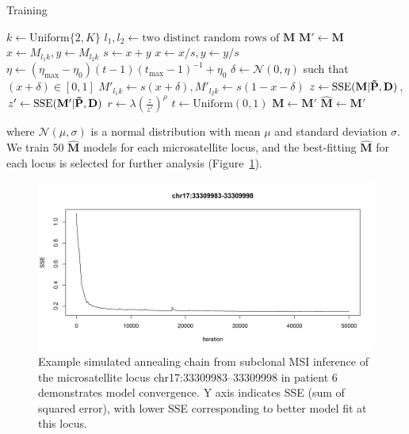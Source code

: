 \begin{algorithm}[H]
	\caption{Training}
	\label{alg:msiclones:mh-train}
	\begin{algorithmic}[1]
			\State $k \gets \text{Uniform}\{2, K\}$ 
			\State $l_1, l_2 \gets \text{two distinct random rows of } \mathbf{M}$ 
			\State $\mathbf{M}' \gets \mathbf{M}$
			\State $x \gets M_{l_1 k}, y \gets M_{l_2 k}$
			\State $s \gets {x + y}$
			\State $x \gets x/s, y \gets y/s$
			\State $\eta \gets (\eta_\text{max} - \eta_0)(t-1)(t_\text{max}-1)^{-1} + \eta_0$ 
			\State $\delta \gets \mathcal{N}(0, \eta)$ such that $(x + \delta) \in [0, 1]$
			\State $M'_{l_1 k} \gets s(x + \delta), M'_{l_2 k} \gets s(1 - x - \delta)$ 
			\State $z \gets \operatorname{SSE}(\mathbf{M} | \mathbf{\tilde{P}}, \mathbf{D})$, $z' \gets \operatorname{SSE}(\mathbf{M}' | \mathbf{\tilde{P}}, \mathbf{D})$
			\State $r \gets \lambda (\!\frac{z}{z'}\!)^\rho$
			\State $t \gets \text{Uniform}(0, 1)$
				{$\mathbf{M} \gets \mathbf{M}'$} 
				{$\hat{\mathbf{M}} \gets \mathbf{M}'$} 
		\EndFor
	\end{algorithmic}
\end{algorithm}%
\noindent where $\mathcal{N}(\mu, \sigma)$ is a normal distribution with mean $\mu$ and standard deviation $\sigma$. We train 50 $\hat{\mathbf{M}}$ models for each microsatellite locus, and the best-fitting $\hat{\mathbf{M}}$ for each locus is selected for further analysis (Figure~\ref{fig:msiclones:mcmc_path}).

\begin{figure}[ht]
    \begin{center}
        \includegraphics[width=0.95\linewidth]{images/msiclones/mcmc_path}
    \end{center}
	\vspace{-0.3cm}
    \caption[Example simulated annealing chain.]{Example simulated annealing chain from subclonal MSI inference of the microsatellite locus chr17:33309983--33309998 in patient 6 demonstrates model convergence. Y axis indicates SSE (sum of squared error), with lower SSE corresponding to better model fit at this locus.}
    \label{fig:msiclones:mcmc_path}
\end{figure}

